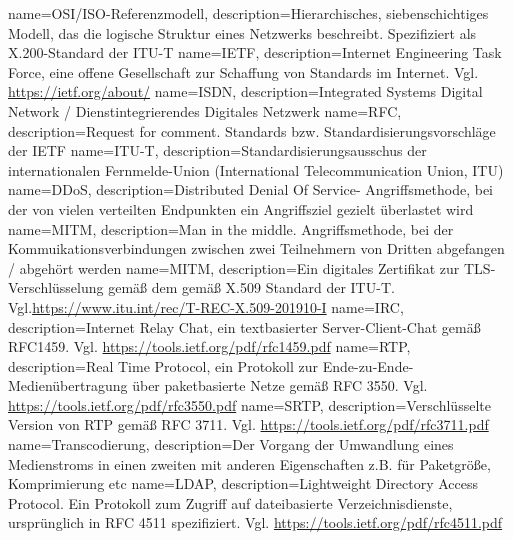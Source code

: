 {
    name=OSI/ISO-Referenzmodell,
    description={Hierarchisches, siebenschichtiges Modell, das die logische Struktur eines Netzwerks beschreibt. Spezifiziert als X.200-Standard der \acrshort{ITU-T}}
}
{
    name=IETF,
    description={Internet Engineering Task Force, eine offene Gesellschaft zur Schaffung von Standards im Internet. Vgl. \url{https://ietf.org/about/}}
}
{
    name=ISDN,
    description={Integrated Systems Digital Network / Dienstintegrierendes Digitales Netzwerk}
}
{
    name=RFC,
    description={Request for comment. Standards bzw. Standardisierungsvorschläge der IETF}
}
{
    name=ITU-T,
    description={Standardisierungsausschus der internationalen Fernmelde-Union (International Telecommunication Union, ITU)}
}
{
    name=DDoS,
    description={Distributed Denial Of Service- Angriffsmethode, bei der von vielen verteilten Endpunkten ein Angriffsziel gezielt überlastet wird}
}
{
    name=MITM,
    description={Man in the middle. Angriffsmethode, bei der Kommuikationsverbindungen zwischen zwei Teilnehmern von Dritten abgefangen / abgehört werden}
}
{
    name=MITM,
    description={Ein digitales Zertifikat zur \acrshort{TLS}-Verschlüsselung gemäß dem gemäß X.509 Standard der \acrshort{ITU-T}. Vgl.\url{https://www.itu.int/rec/T-REC-X.509-201910-I}}
}
{
    name=IRC,
    description={Internet Relay Chat, ein textbasierter Server-Client-Chat gemäß RFC1459. Vgl. \url{https://tools.ietf.org/pdf/rfc1459.pdf}}
}
{
    name=RTP,
    description={Real Time Protocol, ein Protokoll zur Ende-zu-Ende-Medienübertragung über paketbasierte Netze gemäß RFC 3550. Vgl. \url{https://tools.ietf.org/pdf/rfc3550.pdf}}
}
{
    name=SRTP,
    description={Verschlüsselte Version von \acrshort{RTP} gemäß RFC 3711. Vgl. \url{https://tools.ietf.org/pdf/rfc3711.pdf}}
}
{
    name=Transcodierung,
    description={Der Vorgang der Umwandlung eines Medienstroms in einen zweiten mit anderen Eigenschaften z.B. für Paketgröße, Komprimierung etc}
}
{
    name=LDAP,
    description={Lightweight Directory Access Protocol. Ein Protokoll zum Zugriff auf dateibasierte Verzeichnisdienste, ursprünglich in RFC 4511 spezifiziert. Vgl. \url{https://tools.ietf.org/pdf/rfc4511.pdf}}
}
